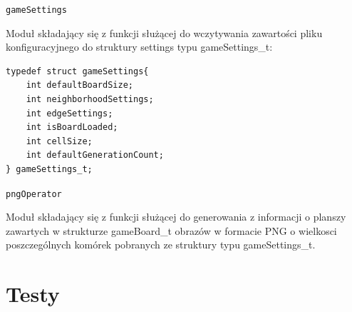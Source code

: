 \documentclass[a4paper,12pt,twoside]{article}
\newcommand{\prog}{\texttt}
\begin{document}
  \prog{gameSettings} 

  \hspace{1.5cm} Moduł składający się z funkcji służącej do wczytywania zawartości pliku konfiguracyjnego do struktury settings typu gameSettings\_t:

\begin{lstlisting}
typedef struct gameSettings{
    int defaultBoardSize;
    int neighborhoodSettings;
    int edgeSettings;
    int isBoardLoaded;
    int cellSize;
    int defaultGenerationCount;
} gameSettings_t;
\end{lstlisting}

  \prog{pngOperator} 

  \hspace{1.5cm} Moduł składający się z funkcji służącej do generowania z informacji o planszy zawartych w strukturze gameBoard\_t obrazów w formacie PNG o wielkosci poszczególnych komórek pobranych ze struktury typu gameSettings\_t.

\section{Testy}
\end{document}

